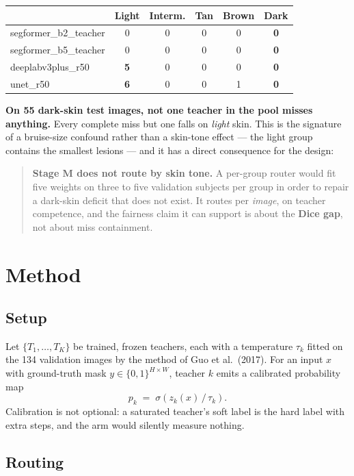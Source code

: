 \documentclass[11pt,a4paper]{article}
\newcommand{\bad}[1]{\textcolor{warn}{\textbf{#1}}}
\begin{document}
\begin{center}
\small
\begin{tabular}{lccccc}
\toprule
 & Light & Interm. & Tan & Brown & \textbf{Dark} \\
\midrule
segformer\_b2\_teacher & 0 & 0 & 0 & 0 & \textbf{0} \\
segformer\_b5\_teacher & 0 & 0 & 0 & 0 & \textbf{0} \\
deeplabv3plus\_r50     & \bad{5} & 0 & 0 & 0 & \textbf{0} \\
unet\_r50              & \bad{6} & 0 & 0 & 1 & \textbf{0} \\
\bottomrule
\end{tabular}
\end{center}

\textbf{On 55 dark-skin test images, not one teacher in the pool misses
anything.} Every complete miss but one falls on \emph{light} skin. This is the
signature of a bruise-size confound rather than a skin-tone effect --- the light
group contains the smallest lesions --- and it has a direct consequence for the
design:

\begin{quote}
\textbf{Stage M does not route by skin tone.} A per-group router would fit five
weights on three to five validation subjects per group in order to repair a
dark-skin deficit that does not exist. It routes per \emph{image}, on
teacher competence, and the fairness claim it can support is about the
\textbf{Dice gap}, not about miss containment.
\end{quote}

\section{Method}

\subsection{Setup}

Let $\{T_1,\dots,T_K\}$ be trained, frozen teachers, each with a temperature
$\tau_k$ fitted on the 134 validation images by the method of Guo et
al.~(2017). For an input $x$ with ground-truth mask $y \in \{0,1\}^{H\times W}$,
teacher $k$ emits a calibrated probability map
\[
p_k \;=\; \sigma\!\left(z_k(x)\,/\,\tau_k\right).
\]
Calibration is not optional: a saturated teacher's soft label is the hard label
with extra steps, and the arm would silently measure nothing.

\subsection{Routing}
\end{document}
